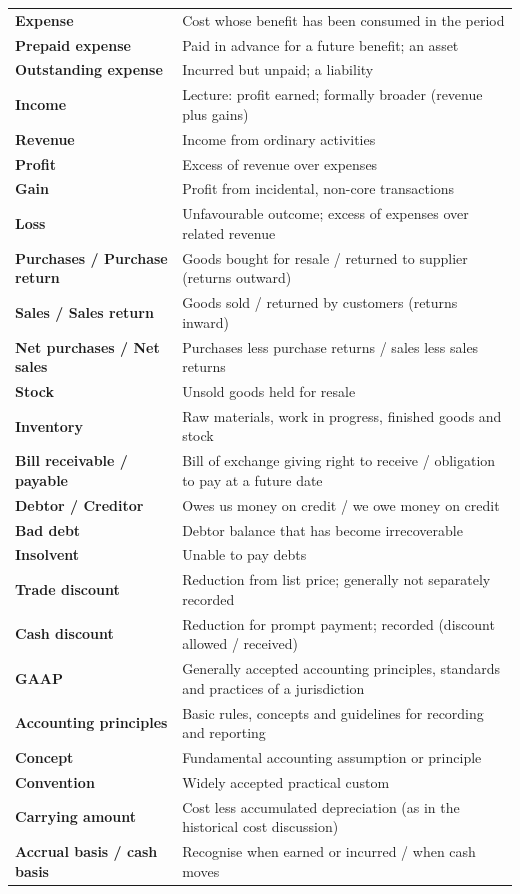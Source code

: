 \documentclass[11pt,a4paper]{article}
\begin{document}
{\begin{xltabular}{\textwidth}{@{}l Y@{}}
\textbf{Expense} & Cost whose benefit has been consumed in the period\\
\textbf{Prepaid expense} & Paid in advance for a future benefit; an asset\\
\textbf{Outstanding expense} & Incurred but unpaid; a liability\\
\textbf{Income} & Lecture: profit earned; formally broader (revenue plus gains)\\
\textbf{Revenue} & Income from ordinary activities\\
\textbf{Profit} & Excess of revenue over expenses\\
\textbf{Gain} & Profit from incidental, non-core transactions\\
\textbf{Loss} & Unfavourable outcome; excess of expenses over related revenue\\
\textbf{Purchases / Purchase return} & Goods bought for resale / returned to supplier (returns outward)\\
\textbf{Sales / Sales return} & Goods sold / returned by customers (returns inward)\\
\textbf{Net purchases / Net sales} & Purchases less purchase returns / sales less sales returns\\
\textbf{Stock} & Unsold goods held for resale\\
\textbf{Inventory} & Raw materials, work in progress, finished goods and stock\\
\textbf{Bill receivable / payable} & Bill of exchange giving right to receive / obligation to pay at a future date\\
\textbf{Debtor / Creditor} & Owes us money on credit / we owe money on credit\\
\textbf{Bad debt} & Debtor balance that has become irrecoverable\\
\textbf{Insolvent} & Unable to pay debts\\
\textbf{Trade discount} & Reduction from list price; generally not separately recorded\\
\textbf{Cash discount} & Reduction for prompt payment; recorded (discount allowed / received)\\
\textbf{GAAP} & Generally accepted accounting principles, standards and practices of a jurisdiction\\
\textbf{Accounting principles} & Basic rules, concepts and guidelines for recording and reporting\\
\textbf{Concept} & Fundamental accounting assumption or principle\\
\textbf{Convention} & Widely accepted practical custom\\
\textbf{Carrying amount} & Cost less accumulated depreciation (as in the historical cost discussion)\\
\textbf{Accrual basis / cash basis} & Recognise when earned or incurred / when cash moves\\
\end{xltabular}
}
\end{document}
